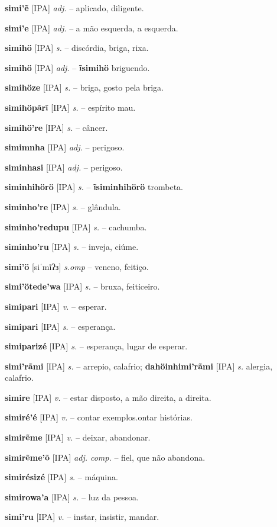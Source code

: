 \textbf{simi'ẽ} [IPA] \textit{adj.} -- aplicado, diligente.

\textbf{simi'e} [IPA] \textit{adj.} -- a mão esquerda, a esquerda.

\textbf{simihö} [IPA] \textit{s.} -- discórdia, briga, rixa.

\textbf{simihö} [IPA] \textit{adj.} -- \textbf{ĩsimihö} briguendo.

\textbf{simihöze} [IPA] \textit{s.} -- briga, gosto pela briga.

\textbf{simihöpãrĩ} [IPA] \textit{s.} -- espírito mau.

\textbf{simihö're} [IPA] \textit{s.} -- câncer.

\textbf{simimnha} [IPA] \textit{adj.} -- perigoso.

\textbf{siminhasi} [IPA] \textit{adj.} -- perigoso.

\textbf{siminhihörö} [IPA] \textit{s.} -- \textbf{ĩsiminhihörö} trombeta.

\textbf{siminho're} [IPA] \textit{s.} -- glândula.

\textbf{siminho'redupu} [IPA] \textit{s.} -- cachumba.

\textbf{siminho'ru} [IPA] \textit{s.} -- inveja, ciúme.

\textbf{simi'ö} [siˈmĩʔɜ] \textit{s.omp} -- veneno, feitiço.

\textbf{simi'ötede'wa} [IPA] \textit{s.} -- bruxa, feiticeiro.

\textbf{simipari} [IPA] \textit{v.} -- esperar.

\textbf{simipari} [IPA] \textit{s.} -- esperança.

\textbf{simiparizé} [IPA] \textit{s.} -- esperança, lugar de esperar.

\textbf{simi'rãmi} [IPA] \textit{s.} -- arrepio, calafrio; \textbf{dahöinhimi'rãmi} [IPA] \textit{s.} alergia, calafrio.

\textbf{simire} [IPA] \textit{v.} -- estar disposto, a mão direita, a direita.

\textbf{simiré'é} [IPA] \textit{v.} -- contar exemplos.ontar histórias.

\textbf{simirẽme} [IPA] \textit{v.} -- deixar, abandonar.

\textbf{simirẽme'õ} [IPA] \textit{adj. comp.} -- fiel, que não abandona.

\textbf{simirésizé} [IPA] \textit{s.} -- máquina.

\textbf{simirowa'a} [IPA] \textit{s.} -- luz da pessoa.

\textbf{simi'ru} [IPA] \textit{v.} -- instar, insistir, mandar.

